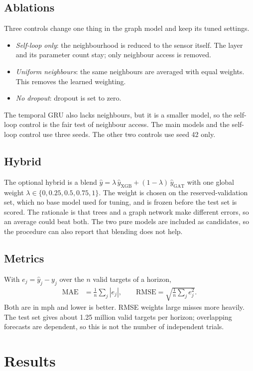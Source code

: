 \documentclass[conference]{IEEEtran}
\begin{document}
\subsection{Ablations}
Three controls change one thing in the graph model and keep its tuned settings.
\begin{itemize}
\item \emph{Self-loop only}: the neighbourhood is reduced to the sensor itself. The layer and its parameter count stay; only neighbour access is removed.
\item \emph{Uniform neighbours}: the same neighbours are averaged with equal weights. This removes the learned weighting.
\item \emph{No dropout}: dropout is set to zero.
\end{itemize}
The temporal GRU also lacks neighbours, but it is a smaller model, so the self-loop control is the fair test of neighbour access. The main models and the self-loop control use three seeds. The other two controls use seed 42 only.

\subsection{Hybrid}
The optional hybrid is a blend $\hat y=\lambda\,\hat y_{\mathrm{XGB}}+(1-\lambda)\,\hat y_{\mathrm{GAT}}$ with one global weight $\lambda\in\{0,0.25,0.5,0.75,1\}$. The weight is chosen on the reserved-validation set, which no base model used for tuning, and is frozen before the test set is scored. The rationale is that trees and a graph network make different errors, so an average could beat both. The two pure models are included as candidates, so the procedure can also report that blending does not help.

\subsection{Metrics}
With $e_j=\hat y_j-y_j$ over the $n$ valid targets of a horizon,
\begin{align}
\mathrm{MAE}&=\frac1n\sum_j|e_j|,\qquad
\mathrm{RMSE}=\sqrt{\frac1n\sum_j e_j^2}.
\end{align}
Both are in mph and lower is better. RMSE weights large misses more heavily. The test set gives about 1.25 million valid targets per horizon; overlapping forecasts are dependent, so this is not the number of independent trials.

\section{Results}
\end{document}

